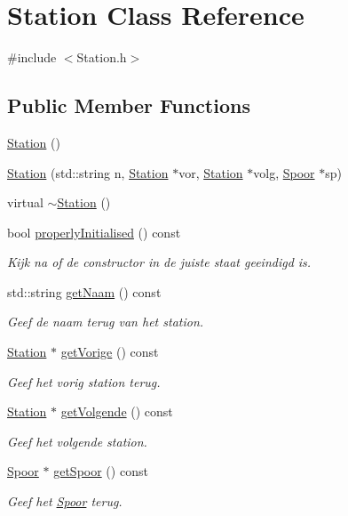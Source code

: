 \hypertarget{class_station}{}\section{Station Class Reference}
\label{class_station}


{\ttfamily \#include $<$Station.\+h$>$}

\subsection*{Public Member Functions}
\begin{DoxyCompactItemize}
\item 
\hyperlink{class_station_a73d335726aad1d844d81cda6d9fd74e6}{Station} ()
\item 
\hyperlink{class_station_a1685ff9a628b922fbc6a75f0f23c7b7e}{Station} (std\+::string n, \hyperlink{class_station}{Station} $\ast$vor, \hyperlink{class_station}{Station} $\ast$volg, \hyperlink{class_spoor}{Spoor} $\ast$sp)
\item 
virtual \hyperlink{class_station_a00434e79e8ee7f4ebd6d3b631dde5ac0}{$\sim$\+Station} ()
\item 
bool \hyperlink{class_station_a9ce626dd0599e3ea8107404a59c21e16}{properly\+Initialised} () const
\begin{DoxyCompactList}\small\item\em Kijk na of de constructor in de juiste staat geeindigd is. \end{DoxyCompactList}\item 
std\+::string \hyperlink{class_station_aea6c31c39a5e1eb4c30337e7ce489e69}{get\+Naam} () const
\begin{DoxyCompactList}\small\item\em Geef de naam terug van het station. \end{DoxyCompactList}\item 
\hyperlink{class_station}{Station} $\ast$ \hyperlink{class_station_a69c0539e899ff540c38eb434a69bfa9e}{get\+Vorige} () const
\begin{DoxyCompactList}\small\item\em Geef het vorig station terug. \end{DoxyCompactList}\item 
\hyperlink{class_station}{Station} $\ast$ \hyperlink{class_station_a330c297adddcbfd5d8871075291e9512}{get\+Volgende} () const
\begin{DoxyCompactList}\small\item\em Geef het volgende station. \end{DoxyCompactList}\item 
\hyperlink{class_spoor}{Spoor} $\ast$ \hyperlink{class_station_a5230690094cdfd1e9f443d76f35c8a19}{get\+Spoor} () const
\begin{DoxyCompactList}\small\item\em Geef het \hyperlink{class_spoor}{Spoor} terug. \end{DoxyCompactList}\end{DoxyCompactItemize}


